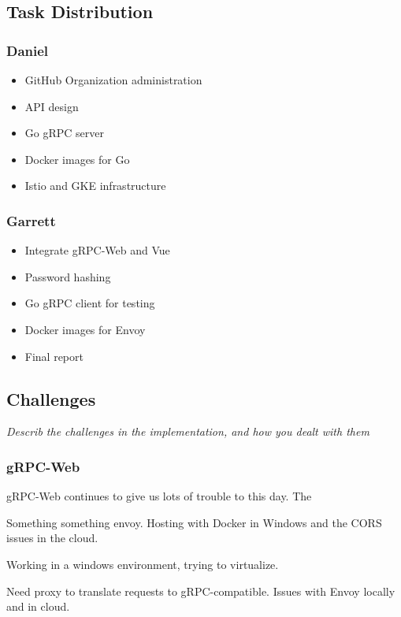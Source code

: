     \subsection{Task Distribution}
        \subsubsection{Daniel}
        \begin{itemize}
            \item GitHub Organization administration
            \item API design
            \item Go gRPC server
            \item Docker images for Go
            \item Istio and GKE infrastructure
        \end{itemize}

        \subsubsection{Garrett}
        \begin{itemize}
            \item Integrate gRPC-Web and Vue
            \item Password hashing
            \item Go gRPC client for testing
            \item Docker images for Envoy
            \item Final report
        \end{itemize}

    \subsection{Challenges}
        \emph{Describ the challenges in the implementation, and how you dealt with them}

        \subsubsection{gRPC-Web}
            gRPC-Web continues to give us lots of trouble to this day. The 

            Something something envoy. Hosting with Docker in Windows and the CORS issues in the cloud.

            Working in a windows environment, trying to virtualize. 

            Need proxy to translate requests to gRPC-compatible. Issues with Envoy locally and in cloud.

